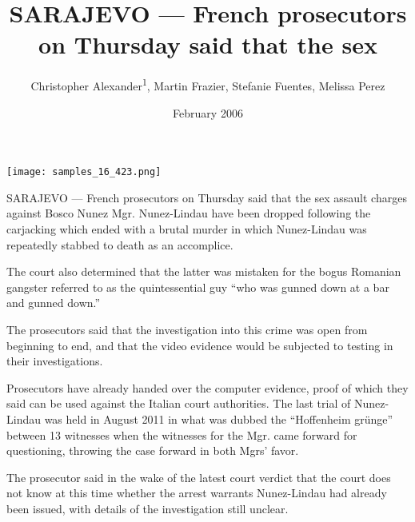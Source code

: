 \documentclass{article}
\title{SARAJEVO — French prosecutors on Thursday said that the sex}
\author{Christopher Alexander\textsuperscript{1},  Martin Frazier,  Stefanie Fuentes,  Melissa Perez}
\affil{\textsuperscript{1}Osaka City University}
\date{February 2006}
\begin{document}
\maketitle

\begin{center}
\begin{minipage}{0.75\linewidth}
\texttt{[image: samples\_16\_423.png]}
\end{minipage}
\end{center}

SARAJEVO — French prosecutors on Thursday said that the sex assault charges against Bosco Nunez Mgr. Nunez-Lindau have been dropped following the carjacking which ended with a brutal murder in which Nunez-Lindau was repeatedly stabbed to death as an accomplice.

The court also determined that the latter was mistaken for the bogus Romanian gangster referred to as the quintessential guy “who was gunned down at a bar and gunned down.”

The prosecutors said that the investigation into this crime was open from beginning to end, and that the video evidence would be subjected to testing in their investigations.

Prosecutors have already handed over the computer evidence, proof of which they said can be used against the Italian court authorities. The last trial of Nunez-Lindau was held in August 2011 in what was dubbed the “Hoffenheim grünge” between 13 witnesses when the witnesses for the Mgr. came forward for questioning, throwing the case forward in both Mgrs’ favor.

The prosecutor said in the wake of the latest court verdict that the court does not know at this time whether the arrest warrants Nunez-Lindau had already been issued, with details of the investigation still unclear.
\end{document}
